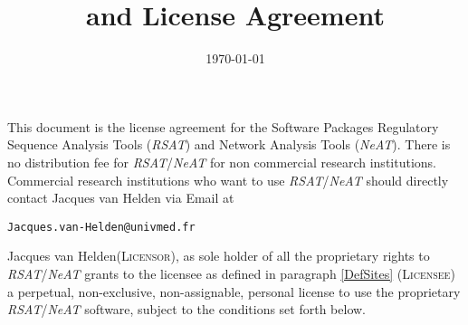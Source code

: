 \documentclass[12pt]{article}
\title{\RSAT and \NeAT License Agreement}
\author{\vspace*{-1cm}}
\date{\vspace*{-1cm}\today}
\makeatletter
\newcommand{\RSAT}[0]{\emph{RSAT}\xspace}
\newcommand{\NeAT}[0]{\emph{NeAT}\xspace}
\newcommand{\Licensorname}[0]{Jacques van Helden\xspace}
\newcommand{\Licensor}[0]{\textsc{Licensor}\xspace}
\newcommand{\Licensee}[0]{\textsc{Licensee}\xspace}
\newcommand{\JvHemail}[0]{\texttt{\small Jacques.van-Helden@univmed.fr}\xspace}
\makeatother
\begin{document}
\maketitle

This document is the license agreement for the Software Packages
Regulatory Sequence Analysis Tools (\RSAT) and Network Analysis Tools
(\NeAT).  There is no distribution fee for \RSAT/\NeAT for non commercial
research institutions. Commercial research institutions who want to
use \RSAT/\NeAT should directly contact Jacques van Helden via Email at
\begin{center}
\JvHemail
\end{center}

\Licensorname (\Licensor), as sole holder of all the proprietary
rights to \RSAT/\NeAT grants to the licensee as defined in paragraph
\ref{DefSites} (\Licensee) a perpetual, non-exclusive, non-assignable,
personal license to use the proprietary \RSAT/\NeAT software, subject to the
conditions set forth below.
\end{document}
